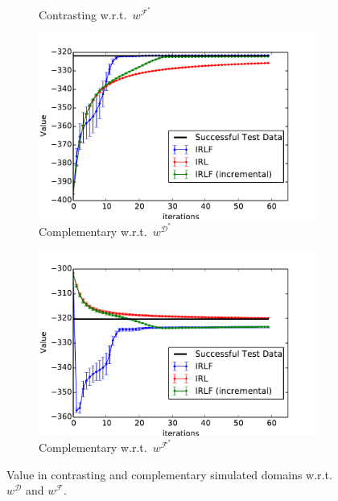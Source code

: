 \documentclass[letterpaper]{article}
\begin{document}
\begin{figure}[t]
\begin{subfigure}[b]{0.475\columnwidth}
    \caption{Contrasting w.r.t.\ $w^{\mathcal{F}^*}$}
    \label{fig:toy_taboo_apprentice_contrastive}
  \end{subfigure}  
  \label{fig:contrastive}
  \begin{subfigure}[b]{0.475\columnwidth}
    \includegraphics[trim=0.5cm 0.5cm 0.5cm 0,clip=true,width=\textwidth]{images/expert_apprentice_complementary.pdf}
    
    \caption{Complementary w.r.t.\ $w^{\mathcal{D}^*}$}
    \label{fig:toy_expert_apprentice_complementary}
  \end{subfigure}
  \hfill
  \begin{subfigure}[b]{0.475\columnwidth}
    \includegraphics[trim=0.5cm 0.5cm 0.5cm 0,clip=true,width=\textwidth]{images/taboo_apprentice_complementary.pdf}
    \caption{Complementary w.r.t.\ $w^{\mathcal{F}^*}$}
    \label{fig:toy_taboo_apprentice_complementary}
  \end{subfigure}  
  \caption{Value in contrasting and complementary simulated domains w.r.t.\ $w^\mathcal{D}$ and $w^\mathcal{F}$. }
  \label{fig:complementary}
\end{figure}
\end{document}
